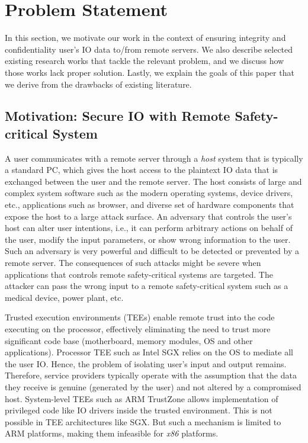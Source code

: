 \section{Problem Statement}
\label{sec:problemStatement}

In this section, we motivate our work in the context of ensuring integrity and confidentiality user's IO data to/from remote servers. We also describe selected existing research works that tackle the relevant problem, and we discuss how those works lack proper solution. Lastly, we explain the goals of this paper that we derive from the drawbacks of existing literature.

\subsection{Motivation: Secure IO with Remote Safety-critical System}

A user communicates with a remote server through a \emph{host} system that is typically a standard PC, which gives the host access to the plaintext IO data that is exchanged between the user and the remote server. The host consists of large and complex system software such as the modern operating systems, device drivers, etc., applications such as browser, and diverse set of hardware components that expose the host to a large attack surface. An adversary that controls the user's host can alter user intentions, i.e., it can perform arbitrary actions on behalf of the user, modify the input parameters, or show wrong information to the user. Such an adversary is very powerful and difficult to be detected or prevented by a remote server. The consequences of such attacks might be severe when applications that controls remote safety-critical systems are targeted. The attacker can pass the wrong input to a remote safety-critical system such as a medical device, power plant, etc.

Trusted execution environments (TEEs) enable remote trust into the code executing on the processor, effectively eliminating the need to trust more significant code base (motherboard, memory modules, OS and other applications). Processor TEE such as Intel SGX relies on the OS to mediate all the user IO. Hence, the problem of isolating user's input and output remains. Therefore, service providers typically operate with the assumption that the data they receive is genuine (generated by the user) and not altered by a compromised host. System-level TEEs such as ARM TrustZone allows implementation of privileged code like IO drivers inside the trusted environment. This is not possible in TEE architectures like SGX. But such a mechanism is limited to ARM platforms, making them infeasible for \emph{x86} platforms. %


